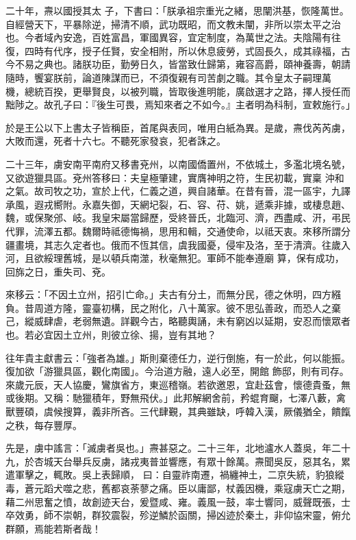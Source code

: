 \begin{pinyinscope}
 二十年，燾以國授其太
 子，下書曰：「朕承祖宗重光之緒，思闡洪基，恢隆萬世。自經營天下，平暴除逆，掃清不順，武功既昭，而文教未闡，非所以崇太平之治也。今者域內安逸，百姓富昌，軍國異容，宜定制度，為萬世之法。夫陰陽有往復，四時有代序，授子任賢，安全相附，所以休息疲勞，式固長久，成其祿福，古今不易之典也。諸朕功臣，勤勞日久，皆當致仕歸第，雍容高爵，頤神養壽，朝請隨時，饗宴朕前，論道陳謀而已，不須復親有司苦劇之職。其令皇太子嗣理萬
 機，總統百揆，更舉賢良，以被列職，皆取後進明能，廣啟選才之路，擇人授任而黜陟之。故孔子曰：『後生可畏，焉知來者之不如今。』主者明為科制，宣敕施行。」



 於是王公以下上書太子皆稱臣，首尾與表同，唯用白紙為異。是歲，燾伐芮芮虜，大敗而還，死者十六七。不聽死家發哀，犯者誅之。



 二十三年，虜安南平南府又移書兗州，以南國僑置州，不依城土，多濫北境名號，又欲遊獵具區。兗州答移曰：夫皇極肇建，實膺神明之符，生民初載，實稟
 沖和之氣。故司牧之功，宣於上代，仁義之道，興自諸華。在昔有晉，混一區宇，九譯承風，遐戎嚮附。永嘉失御，天網圮裂，石、容、苻、姚，遞乘非據，或棲息趙、魏，或保聚邠、岐。我皇宋屬當歸歷，受終晉氏，北臨河、濟，西盡咸、汧，弔民代罪，流澤五都。魏爾時祗德悔禍，思用和輯，交通使命，以祗天衷。來移所謂分疆畫境，其志久定者也。俄而不恆其信，虞我國憂，侵牢及洛，至于清濟。往歲入河，且欲綏理舊城，是以頓兵南澨，秋毫無犯。軍師不能奉遵廟
 算，保有成功，回旆之日，重失司、兗。



 來移云：「不因土立州，招引亡命。」夫古有分土，而無分民，德之休明，四方繦負。昔周道方隆，靈臺初構，民之附化，八十萬家。彼不思弘善政，而恐人之棄己，縱威肆虐，老弱無遺。詳觀今古，略聽輿誦，未有窮凶以延期，安忍而懷眾者也。若必宜因土立州，則彼立徐、揚，豈有其地？



 往年貴主獻書云：「強者為雄。」斯則棄德任力，逆行倒施，有一於此，何以能振。復加欲「游獵具區，觀化南國」。今治道方融，遠人必至，開館
 飾邸，則有司存。來歲元辰，天人協慶，鸞旗省方，東巡稽嶺。若欲邀恩，宜赴茲會，懷德貴蚤，無或後期。又稱：馳獵積年，野無飛伏。」此邦解網舍前，矜蜫育飀，七澤八藪，禽獸豐碩，虞候搜算，義非所吝。三代肆覲，其典雖缺，呼韓入漢，厥儀猶全，饋餼之秩，每存豐厚。



 先是，虜中謠言：「滅虜者吳也。」燾甚惡之。二十三年，北地瀘水人蓋吳，年二十九，於杏城天台舉兵反虜，諸戎夷普並響應，有眾十餘萬。燾聞吳反，惡其名，累遣軍擊之，輒敗。吳上表歸順，
 曰：自靈祚南遷，禍纏神土，二京失統，豹狼縱毒，蒼元蹈犬噬之悲，舊都哀荼蓼之痛。臣以庸鄙，杖義因機，乘寇虜天亡之期，藉二州思奮之憤，故創迹天台，爰暨咸、雍。義風一鼓，率士響同，威聲既張，士卒效勇，師不崇朝，群狡震裂，殄逆鱗於函關，掃凶迹於秦土，非仰協宋靈，俯允群願，焉能若斯者哉！




\end{pinyinscope}
